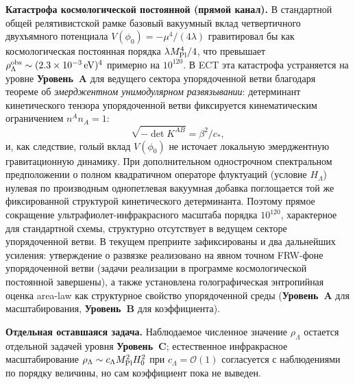 \documentclass[11pt,a4paper]{article}
\newcommand{\statA}{\textbf{Уровень~A}}
\newcommand{\statB}{\textbf{Уровень~B}}
\newcommand{\statC}{\textbf{Уровень~C}}
\begin{document}
\textbf{Катастрофа космологической постоянной (прямой канал).}
В стандартной общей релятивистской рамке базовый вакуумный вклад
четвертичного двухъямного потенциала
$V(\phi_0)=-\mu^4/(4\lambda)$ гравитировал бы как
космологическая постоянная порядка $\lambda M_{\rm Pl}^4/4$,
что превышает $\rho_\Lambda^{\rm obs}
\sim(2.3\times 10^{-3}\,{\rm eV})^4$ примерно на $10^{120}$.
В ECT эта катастрофа устраняется на уровне \statA{} для ведущего
сектора упорядоченной ветви благодаря теореме об
\emph{эмерджентном унимодулярном развязывании}: детерминант
кинетического тензора упорядоченной ветви фиксируется
кинематическим ограничением $n^An_A=1$:
\begin{equation}
  \sqrt{-\det K^{AB}} = \beta^2/c_*,
\end{equation}
и, как следствие, голый вклад $V(\phi_0)$ не источает локальную
эмерджентную гравитационную динамику. При дополнительном
однострочном спектральном предположении о полном квадратичном
операторе флуктуаций (условие $H_\Lambda$) нулевая по производным
однопетлевая вакуумная добавка поглощается той же фиксированной
структурой кинетического детерминанта. Поэтому прямое сокращение
ультрафиолет-инфракрасного масштаба порядка $10^{120}$,
характерное для стандартной схемы, структурно отсутствует в
ведущем секторе упорядоченной ветви.
В текущем препринте зафиксированы и два дальнейших усиления:
утверждение о развязке реализовано на явном точном FRW-фоне
упорядоченной ветви (задачи реализации в программе
космологической постоянной завершены), а также установлена
голографическая энтропийная оценка area-law как структурное
свойство упорядоченной среды
(\statA{} для масштабирования, \statB{} для коэффициента).

\textbf{Отдельная оставшаяся задача.}
Наблюдаемое численное значение $\rho_\Lambda$ остается отдельной
задачей уровня \statC; естественное инфракрасное масштабирование
$\rho_\Lambda\sim c_\Lambda M_{\rm Pl}^2 H_0^2$ при
$c_\Lambda=\mathcal{O}(1)$ согласуется с наблюдениями по порядку
величины, но сам коэффициент пока не выведен.
\end{document}
